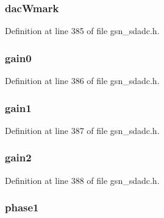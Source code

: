 \hypertarget{a00213_a53535fa0dbf62414d05cdd55ffc632b0}{
\subsubsection[{dacWmark}]{ {\bf dacWmark}}}
\label{a00213_a53535fa0dbf62414d05cdd55ffc632b0}


Definition at line 385 of file gsn\_\-sdadc.h.

\hypertarget{a00213_ac501092e8065544ab192c666c655af11}{
\subsubsection[{gain0}]{ {\bf gain0}}}
\label{a00213_ac501092e8065544ab192c666c655af11}


Definition at line 386 of file gsn\_\-sdadc.h.

\hypertarget{a00213_ad5e95276535516cd6b67fcd9885de9f3}{
\subsubsection[{gain1}]{ {\bf gain1}}}
\label{a00213_ad5e95276535516cd6b67fcd9885de9f3}


Definition at line 387 of file gsn\_\-sdadc.h.

\hypertarget{a00213_ac11903dcfccbcf3d6f5c569dd5840e96}{
\subsubsection[{gain2}]{ {\bf gain2}}}
\label{a00213_ac11903dcfccbcf3d6f5c569dd5840e96}


Definition at line 388 of file gsn\_\-sdadc.h.

\hypertarget{a00213_af252e89f6bf293b62d258d738a0fdce4}{
\subsubsection[{phase1}]{ {\bf phase1}}}
\label{a00213_af252e89f6bf293b62d258d738a0fdce4}


